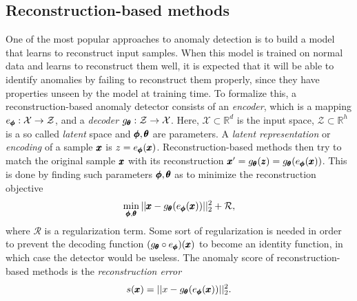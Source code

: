 \subsection{Reconstruction-based methods} \label{sec:reconstruction_models}
One of the most popular approaches to anomaly detection is to build a model that learns to reconstruct input samples. When this model is trained on normal data and learns to reconstruct them well, it is expected that it will be able to identify anomalies by failing to reconstruct them properly, since they have properties unseen by the model at training time. To formalize this, a reconstruction-based anomaly detector consists of an \textit{encoder}, which is a mapping $e_{\pmb{{\phi}}}:\mathcal{X} \rightarrow \mathcal{Z}$, and a \textit{decoder} $g_{\pmb{{\theta}}}: \mathcal{Z} \rightarrow \mathcal{X}$. Here, $\mathcal{X} \subset \mathbb{R}^d$ is the input space, $\mathcal{Z} \subset \mathbb{R}^h$ is a so called \textit{latent} space and $\pmb{{\phi}},\pmb{{\theta}}$ are parameters. A \textit{latent representation} or \textit{encoding} of a sample $\pmb{{x}}$ is $z = e_{\pmb{{\phi}}}(\pmb{{x}})$. Reconstruction-based methods then try to match the original sample $\pmb{{x}}$ with its reconstruction $\pmb{{x}}' = g_{\pmb{{\theta}}}(\pmb{{z}})=g_{\pmb{{\theta}}}(e_{\pmb{{\phi}}}(\pmb{{x}}))$. This is done by finding such parameters $\pmb{{\phi}}, \pmb{{\theta}}$ as to minimize the reconstruction objective
\begin{equation} \label{eq:reconstruction_objective}
	\min_{\pmb{{\phi}}, \pmb{{\theta}}} \vert \vert \pmb{{x}} - g_{\pmb{{\theta}}}(e_{\pmb{{\phi}}}(\pmb{{x}})) \vert \vert_2^2 + \mathcal{R},
\end{equation}
where $\mathcal{R}$ is a regularization term. Some sort of regularization is needed in order to prevent the decoding function $(g_{\pmb{{\theta}}} \circ e_{\pmb{{\phi}}})(\pmb{{x}})$ to become an identity function, in which case the detector would be useless. The anomaly score of reconstruction-based methods is the \textit{reconstruction error}
\begin{equation} \label{eq:reconstruction_error}
	s(\pmb{{x}}) = \vert \vert x - g_{\pmb{{\theta}}}(e_{\pmb{{\phi}}}(\pmb{{x}})) \vert \vert_2^2.
\end{equation}


